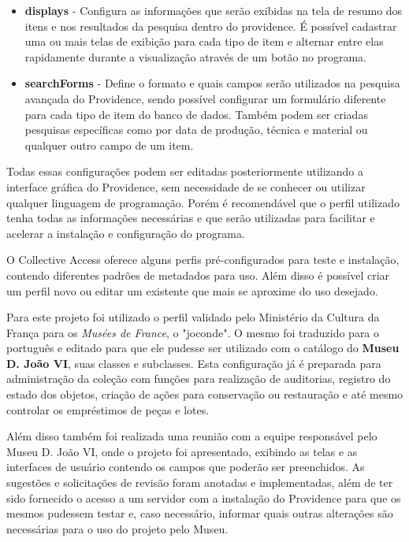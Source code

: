 \documentclass[a4paper,12pt,oneside,onecolumn,final,fleqn]{repUERJ}
\begin{document}
\begin{itemize}
	\item \textbf{displays} - Configura as informações que serão exibidas na tela de resumo dos itens e nos resultados da pesquisa dentro do providence. É possível cadastrar uma ou mais telas de exibição para cada tipo de item e alternar entre elas rapidamente durante a visualização através de um botão no programa.
	\item \textbf{searchForms} - Define o formato e quais campos serão utilizados na pesquisa avançada do Providence, sendo possível configurar um formulário diferente para cada tipo de item do banco de dados. Também podem ser criadas pesquisas específicas como por data de produção, técnica e material ou qualquer outro campo de um item.
\end{itemize}


Todas essas configurações podem ser editadas posteriormente utilizando a interface gráfica do Providence, sem necessidade de se conhecer ou utilizar qualquer linguagem de programação. Porém é recomendável que o perfil utilizado tenha todas as informações necessárias e que serão utilizadas para facilitar e acelerar a instalação e configuração do programa.

O Collective Access oferece alguns perfis pré-configurados para teste e instalação, contendo diferentes padrões de metadados para uso. Além disso é possível criar um perfil novo ou editar um existente que mais se aproxime do uso desejado.

Para este projeto foi utilizado o perfil validado pelo Ministério da Cultura da França para os \textit{Musées de France}, o "joconde". O mesmo foi traduzido para o português e editado para que ele pudesse ser utilizado com o catálogo do \textbf{Museu D. João VI}, suas classes e subclasses. Esta configuração já é preparada para administração da coleção com funções para realização de auditorias, registro do estado dos objetos, criação de ações para conservação ou restauração e até mesmo controlar os empréstimos de peças e lotes.

Além disso também foi realizada uma reunião com a equipe responsável pelo Museu D. João VI, onde o projeto foi apresentado, exibindo as telas e as interfaces de usuário contendo os campos que poderão ser preenchidos. As sugestões e solicitações de revisão foram anotadas e implementadas, além de ter sido fornecido o acesso a um servidor com a instalação do Providence para que os mesmos pudessem testar e, caso necessário, informar quais outras alterações são necessárias para o uso do projeto pelo Museu.
\end{document}

